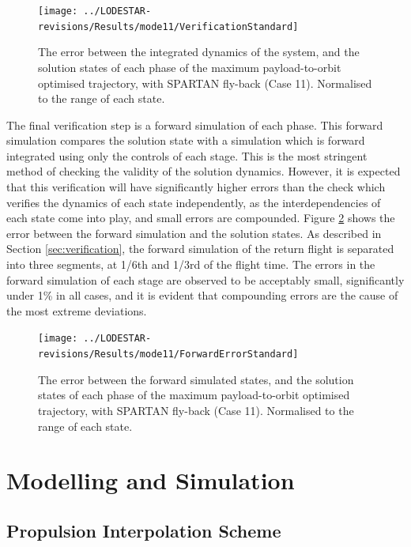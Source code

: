 \begin{figure}[ht]
	\centering
	\texttt{[image: ../LODESTAR-revisions/Results/mode11/VerificationStandard]}
	\caption{The error between the integrated dynamics of the system, and the solution states of each phase of the maximum payload-to-orbit optimised trajectory, with SPARTAN fly-back (Case 11). Normalised to the range of each state.}
	\label{fig:VerificationStandard}
\end{figure}

The final verification step is a forward simulation of each phase. This forward simulation compares the solution state with a simulation which is forward integrated using only the controls of each stage. This is the most stringent method of checking the validity of the solution dynamics. However, it is expected that this verification will have significantly higher errors than the check which verifies the dynamics of each state independently, as the interdependencies of each state come into play, and small errors are compounded. Figure \ref{fig:ForwardErrorStandard} shows the error between the forward simulation and the solution states. As described in Section \ref{sec:verification}, the forward simulation of the return flight is separated into three segments, at 1/6th and 1/3rd of the flight time. The errors in the forward simulation of each stage are observed to be acceptably small, significantly under 1\% in all cases, and it is evident that compounding errors are the cause of the most extreme deviations. 

\begin{figure}[ht]
	\centering
	\texttt{[image: ../LODESTAR-revisions/Results/mode11/ForwardErrorStandard]}
	\caption{The error between the forward simulated states, and the solution states of each phase of the maximum payload-to-orbit optimised trajectory, with SPARTAN fly-back (Case 11). Normalised to the range of each state.}
	\label{fig:ForwardErrorStandard}
\end{figure}



\chapter{Modelling and Simulation}\label{Appendix:sim}
\section{Propulsion Interpolation Scheme}

